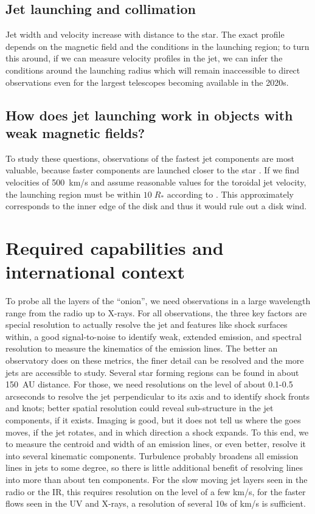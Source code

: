 \documentclass[12pt]{article}
\begin{document}
\subsection{Jet launching and collimation}
Jet width and velocity increase with distance to the star. The exact profile depends on the magnetic field and the conditions in the launching region; to turn this around, if we can measure velocity profiles in the jet, we can infer the conditions around the launching radius which will remain inaccessible to direct observations even for the largest telescopes becoming available in the 2020s.

\subsection{How does jet launching work in objects with weak magnetic fields?}
To study these questions, observations of the fastest jet components are most valuable, because faster components are launched closer to the star \citep{2003ApJ...590L.107A}. If we find velocities of 500~km/s and assume reasonable values for the toroidal jet velocity, the launching region must be within $10\;R_*$ according to \citet{2003ApJ...590L.107A}. This approximately corresponds to the inner edge of the disk and thus it would rule out a disk wind.

\section{Required capabilities and international context}
To probe all the layers of the ``onion'', we need observations in a large wavelength range from the radio up to X-rays. For all observations, the three key factors are special resolution to actually resolve the jet and features like shock surfaces within, a good signal-to-noise to identify weak, extended emission, and spectral resolution to measure the kinematics of the emission lines. The better an observatory does on these metrics, the finer detail can be resolved and the more jets are accessible to study. Several star forming regions can be found in about 150~AU distance. For those, we need resolutions on the level of about 0.1-0.5 arcseconds to resolve the jet perpendicular to its axis and to identify shock fronts and knots; better spatial resolution could reveal sub-structure in the jet components, if it exists. Imaging is good, but it does not tell us where the goes moves, if the jet rotates, and in which direction a shock expands. To this end, we to measure the centroid and width of an emission lines, or even better, resolve it into several kinematic components. Turbulence probably broadens all emission lines in jets to some degree, so there is little additional benefit of resolving lines into more than about ten components. For the slow moving jet layers seen in the radio or the IR, this requires resolution on the level of a few km/s, for the faster flows seen in the UV and X-rays, a resolution of several 10s of km/s is sufficient.
\end{document}
